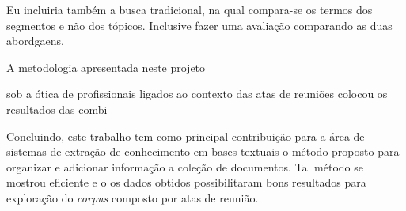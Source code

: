 


Eu incluiria também a busca tradicional, na qual compara-se os termos dos segmentos e não dos tópicos. Inclusive fazer uma avaliação comparando as duas abordgaens.





A metodologia apresentada neste projeto 































sob a ótica de profissionais ligados ao contexto das atas de reuniões 
colocou os resultados das combi






Concluindo, este trabalho tem como principal contribuição para a área de sistemas de extração de conhecimento em bases textuais o método proposto para organizar e adicionar informação a coleção de documentos. Tal método se mostrou eficiente e o os dados obtidos possibilitaram bons resultados para exploração do \textit{corpus} composto por atas de reunião.





















